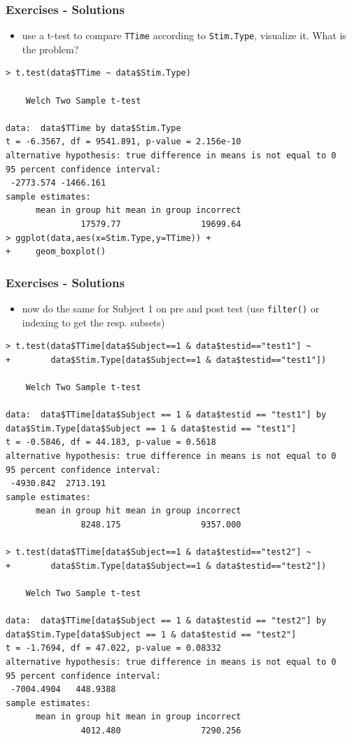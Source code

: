 \documentclass[xcolor={table}]{beamer}
\begin{document}
\begin{frame}[fragile]\frametitle{Exercises - Solutions}
  \begin{itemize}
  \item use a t-test to compare \texttt{TTime} according to \texttt{Stim.Type}, visualize it. What is the problem?
  \end{itemize}\tiny
\begin{verbatim}
> t.test(data$TTime ~ data$Stim.Type)

	Welch Two Sample t-test

data:  data$TTime by data$Stim.Type
t = -6.3567, df = 9541.891, p-value = 2.156e-10
alternative hypothesis: true difference in means is not equal to 0
95 percent confidence interval:
 -2773.574 -1466.161
sample estimates:
      mean in group hit mean in group incorrect 
               17579.77                19699.64   
> ggplot(data,aes(x=Stim.Type,y=TTime)) +
+     geom_boxplot()
\end{verbatim}
\end{frame}


\begin{frame}\frametitle{Exercises - Solutions}
  \begin{itemize}
  \item now do the same for Subject 1 on pre and post test (use \texttt{filter()} or indexing to get the resp. subsets)
  \end{itemize}\footnotesize
\begin{verbatim}
> t.test(data$TTime[data$Subject==1 & data$testid=="test1"] ~
+        data$Stim.Type[data$Subject==1 & data$testid=="test1"])

	Welch Two Sample t-test

data:  data$TTime[data$Subject == 1 & data$testid == "test1"] by data$Stim.Type[data$Subject == 1 & data$testid == "test1"]
t = -0.5846, df = 44.183, p-value = 0.5618
alternative hypothesis: true difference in means is not equal to 0
95 percent confidence interval:
 -4930.842  2713.191
sample estimates:
      mean in group hit mean in group incorrect 
               8248.175                9357.000 

> t.test(data$TTime[data$Subject==1 & data$testid=="test2"] ~
+        data$Stim.Type[data$Subject==1 & data$testid=="test2"])

	Welch Two Sample t-test

data:  data$TTime[data$Subject == 1 & data$testid == "test2"] by data$Stim.Type[data$Subject == 1 & data$testid == "test2"]
t = -1.7694, df = 47.022, p-value = 0.08332
alternative hypothesis: true difference in means is not equal to 0
95 percent confidence interval:
 -7004.4904   448.9388
sample estimates:
      mean in group hit mean in group incorrect 
               4012.480                7290.256 

\end{verbatim}
\end{frame}
\end{document}
